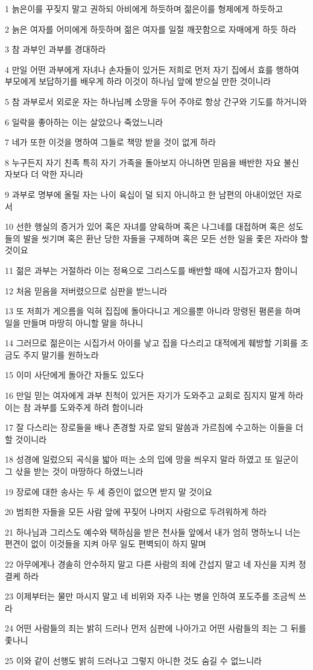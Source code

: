 \par 1 늙은이를 꾸짖지 말고 권하되 아비에게 하듯하며 젊은이를 형제에게 하듯하고
\par 2 늙은 여자를 어미에게 하듯하며 젊은 여자를 일절 깨끗함으로 자매에게 하듯 하라
\par 3 참 과부인 과부를 경대하라
\par 4 만일 어떤 과부에게 자녀나 손자들이 있거든 저희로 먼저 자기 집에서 효를 행하여 부모에게 보답하기를 배우게 하라 이것이 하나님 앞에 받으실 만한 것이니라
\par 5 참 과부로서 외로운 자는 하나님께 소망을 두어 주야로 항상 간구와 기도를 하거니와
\par 6 일락을 좋아하는 이는 살았으나 죽었느니라
\par 7 네가 또한 이것을 명하여 그들로 책망 받을 것이 없게 하라
\par 8 누구든지 자기 친족 특히 자기 가족을 돌아보지 아니하면 믿음을 배반한 자요 불신 자보다 더 악한 자니라
\par 9 과부로 명부에 올릴 자는 나이 육십이 덜 되지 아니하고 한 남편의 아내이었던 자로서
\par 10 선한 행실의 증거가 있어 혹은 자녀를 양육하며 혹은 나그네를 대접하며 혹은 성도들의 발을 씻기며 혹은 환난 당한 자들을 구제하며 혹은 모든 선한 일을 좇은 자라야 할것이요
\par 11 젊은 과부는 거절하라 이는 정욕으로 그리스도를 배반할 때에 시집가고자 함이니
\par 12 처음 믿음을 저버렸으므로 심판을 받느니라
\par 13 또 저희가 게으름을 익혀 집집에 돌아다니고 게으를뿐 아니라 망령된 폄론을 하며 일을 만들며 마땅히 아니할 말을 하나니
\par 14 그러므로 젊은이는 시집가서 아이를 낳고 집을 다스리고 대적에게 훼방할 기회를 조금도 주지 말기를 원하노라
\par 15 이미 사단에게 돌아간 자들도 있도다
\par 16 만일 믿는 여자에게 과부 친척이 있거든 자기가 도와주고 교회로 짐지지 말게 하라 이는 참 과부를 도와주게 하려 함이니라
\par 17 잘 다스리는 장로들을 배나 존경할 자로 알되 말씀과 가르침에 수고하는 이들을 더할 것이니라
\par 18 성경에 일렀으되 곡식을 밟아 떠는 소의 입에 망을 씌우지 말라 하였고 또 일군이 그 삯을 받는 것이 마땅하다 하였느니라
\par 19 장로에 대한 송사는 두 세 증인이 없으면 받지 말 것이요
\par 20 범죄한 자들을 모든 사람 앞에 꾸짖어 나머지 사람으로 두려워하게 하라
\par 21 하나님과 그리스도 예수와 택하심을 받은 천사들 앞에서 내가 엄히 명하노니 너는 편견이 없이 이것들을 지켜 아무 일도 편벽되이 하지 말며
\par 22 아무에게나 경솔히 안수하지 말고 다른 사람의 죄에 간섭지 말고 네 자신을 지켜 정결케 하라
\par 23 이제부터는 물만 마시지 말고 네 비위와 자주 나는 병을 인하여 포도주를 조금씩 쓰라
\par 24 어떤 사람들의 죄는 밝히 드러나 먼저 심판에 나아가고 어떤 사람들의 죄는 그 뒤를 좇나니
\par 25 이와 같이 선행도 밝히 드러나고 그렇지 아니한 것도 숨길 수 없느니라

